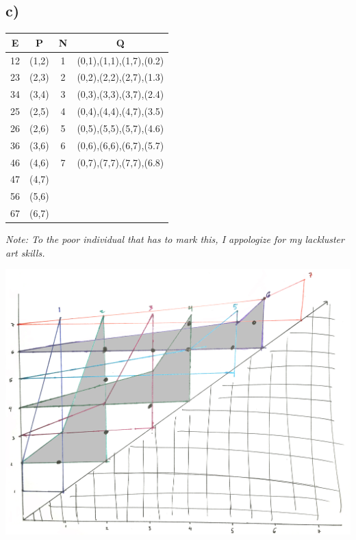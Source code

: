 \documentclass[12pt]{article}
\begin{document}
\subsection*{c)}
\begin{tabular}{|c|c||c|c|}
\hline
\textbf{E} & \textbf{P} & \textbf{N} & \textbf{Q}\\
\hline
12 & (1,2) & 1 & (0,1),(1,1),(1,7),(0.2)\\
\hline
23 & (2,3) & 2 & (0,2),(2,2),(2,7),(1.3)\\
\hline
34 & (3,4) & 3 & (0,3),(3,3),(3,7),(2.4)\\
\hline
25 & (2,5) & 4 & (0,4),(4,4),(4,7),(3.5)\\
\hline
26 & (2,6) & 5 & (0,5),(5,5),(5,7),(4.6)\\
\hline
36 & (3,6) & 6 & (0,6),(6,6),(6,7),(5.7)\\
\hline
46 & (4,6) & 7 & (0,7),(7,7),(7,7),(6.8)\\
\hline
47 & (4,7) & & \\
\hline
56 & (5,6) & & \\
\hline
67 & (6,7) & & \\
\hline
\end{tabular}

\textit{Note: To the poor individual that has to mark this, I appologize for my lackluster art skills.}

\includegraphics[scale=0.2, angle=90]{data}
\end{document}

